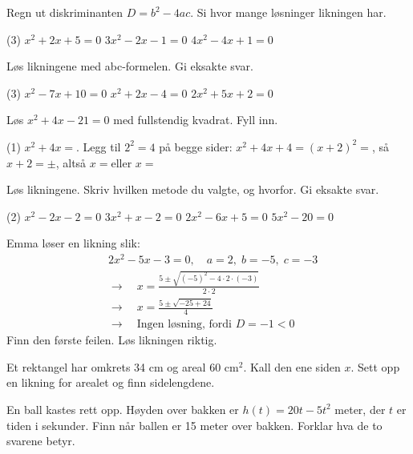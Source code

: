 
Regn ut diskriminanten $D = b^2 - 4ac$. Si hvor mange løsninger likningen har.
\begin{tasks}(3)
  \task $x^2 + 2x + 5 = 0$
  \task $3x^2 - 2x - 1 = 0$
  \task $4x^2 - 4x + 1 = 0$
\end{tasks}

Løs likningene med abc-formelen. Gi eksakte svar.
\begin{tasks}(3)
  \task $x^2 - 7x + 10 = 0$
  \task $x^2 + 2x - 4 = 0$
  \task $2x^2 + 5x + 2 = 0$
\end{tasks}

Løs $x^2 + 4x - 21 = 0$ med fullstendig kvadrat. Fyll inn.
\begin{tasks}(1)
  \task $x^2 + 4x = $\skrivlinje[1.2cm]. Legg til $2^2 = 4$ på begge sider: $x^2 + 4x + 4 = $\skrivlinje[1.2cm]
  \task $(x + 2)^2 = $\skrivlinje[1.2cm], så $x + 2 = \pm$\skrivlinje[1.2cm], altså $x = $\skrivlinje[1.2cm] eller $x = $\skrivlinje[1.2cm]
\end{tasks}


Løs likningene. Skriv hvilken metode du valgte, og hvorfor. Gi eksakte svar.
\begin{tasks}(2)
  \task $x^2 - 2x - 2 = 0$
  \task $3x^2 + x - 2 = 0$
  \task $2x^2 - 6x + 5 = 0$
  \task $5x^2 - 20 = 0$
\end{tasks}

Emma løser en likning slik:
\begin{align*}
&2x^2 - 5x - 3 = 0, \quad a = 2,\; b = -5,\; c = -3\\
&\longrightarrow\quad x = \frac{5 \pm \sqrt{(-5)^2 - 4 \cdot 2 \cdot (-3)}}{2 \cdot 2}\\
&\longrightarrow\quad x = \frac{5 \pm \sqrt{-25 + 24}}{4}\\
&\longrightarrow\quad \text{Ingen løsning, fordi } D = -1 < 0
\end{align*}
Finn den første feilen. Løs likningen riktig.

Et rektangel har omkrets 34 cm og areal 60 cm$^2$. Kall den ene siden $x$. Sett opp en likning for arealet og finn sidelengdene.

En ball kastes rett opp. Høyden over bakken er $h(t) = 20t - 5t^2$ meter, der $t$ er tiden i sekunder. Finn når ballen er 15 meter over bakken. Forklar hva de to svarene betyr.

